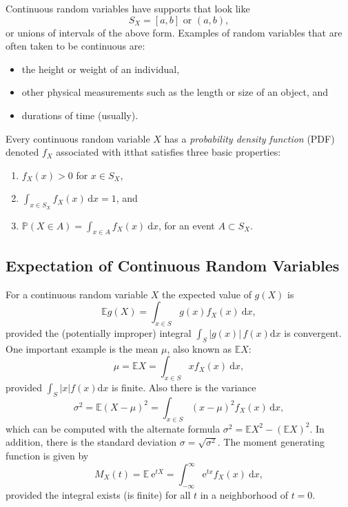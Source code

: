 Continuous random variables have supports that look like
\begin{equation}
S_{X}=[a,b]\mbox{ or }(a,b),
\end{equation}
or unions of intervals of the above form. Examples of random variables
that are often taken to be continuous are:

\begin{itemize}
\item the height or weight of an individual,
\item other physical measurements such as the length or size of an object,
and
\item durations of time (usually).
\end{itemize}

Every continuous random variable \(X\) has a \emph{probability density
function} (PDF) denoted \(f_{X}\) associated with itthat
satisfies three basic properties:
\begin{enumerate}
\item \(f_{X}(x)>0\) for \(x\in S_{X}\),
\item \(\int_{x\in S_{X}}f_{X}(x)\,\mathrm{d} x=1\), and
\item \label{enu-contrvcond3} \(\mathbb{P}(X\in A)=\int_{x\in
   A}f_{X}(x)\:\mathrm{d} x\), for an event \(A\subset S_{X}\).
\end{enumerate}

\subsection{Expectation of Continuous Random Variables}
\label{sec-6-1-2}

For a continuous random variable \(X\) the expected value of \(g(X)\)
is
\begin{equation}
\mathbb{E} g(X)=\int_{x\in S}g(x)f_{X}(x)\:\mathrm{d} x,
\end{equation}
provided the (potentially improper) integral \(\int_{S}|g(x)|\,
f(x)\mathrm{d} x\) is convergent. One important example is the mean
\(\mu\), also known as \(\mathbb{E} X\):
\begin{equation}
\mu=\mathbb{E} X=\int_{x\in S}xf_{X}(x)\:\mathrm{d} x,
\end{equation}
provided \(\int_{S}|x|f(x)\mathrm{d} x\) is finite. Also there is the variance
\begin{equation}
\sigma^{2}=\mathbb{E}(X-\mu)^{2}=\int_{x\in S}(x-\mu)^{2}f_{X}(x)\,\mathrm{d} x,
\end{equation}
which can be computed with the alternate formula
\(\sigma^{2}=\mathbb{E} X^{2}-(\mathbb{E} X)^{2}\). In addition, there
is the standard deviation \(\sigma=\sqrt{\sigma^{2}}\). The moment
generating function is given by
\begin{equation}
M_{X}(t)=\mathbb{E}\:\mathrm{e}^{tX}=\int_{-\infty}^{\infty}\mathrm{e}^{tx}f_{X}(x)\:\mathrm{d} x,
\end{equation}
provided the integral exists (is finite) for all \(t\) in a
neighborhood of \(t=0\).

